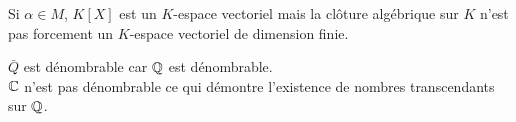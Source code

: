 \begin{remarque}
	Si $\alpha \in M$, $K[X]$ est un $K$-espace vectoriel mais la clôture algébrique sur
	$K$ n'est pas forcement un $K$-espace vectoriel de dimension finie.
\end{remarque}

\begin{remarque}
	$\bar{Q}$ est dénombrable car $\mathbb{Q}$ est dénombrable.\\
	$\mathbb{C}$ n'est pas dénombrable ce qui démontre l'existence de nombres transcendants sur $\mathbb{Q}$.
\end{remarque}




